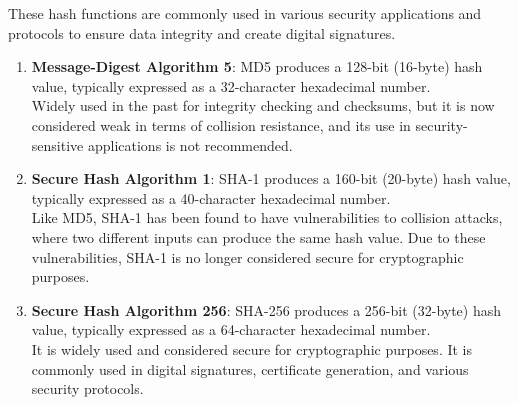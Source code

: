 \noindent These hash functions are commonly used in various security applications and protocols to ensure data integrity and create digital signatures.

\begin{enumerate}
    \item \textbf{Message-Digest Algorithm 5}: MD5 produces a 128-bit (16-byte) hash value, typically expressed as a 32-character hexadecimal number. \\
    Widely used in the past for integrity checking and checksums, but it is now considered weak in terms of collision resistance, and its use in security-sensitive applications is not recommended.
    
    \item \textbf{Secure Hash Algorithm 1}: SHA-1 produces a 160-bit (20-byte) hash value, typically expressed as a 40-character hexadecimal number. \\
    Like MD5, SHA-1 has been found to have vulnerabilities to collision attacks, where two different inputs can produce the same hash value. Due to these vulnerabilities, SHA-1 is no longer considered secure for cryptographic purposes.
    
    \item \textbf{Secure Hash Algorithm 256}: SHA-256 produces a 256-bit (32-byte) hash value, typically expressed as a 64-character hexadecimal number. \\
    It is widely used and considered secure for cryptographic purposes. It is commonly used in digital signatures, certificate generation, and various security protocols.
\end{enumerate}